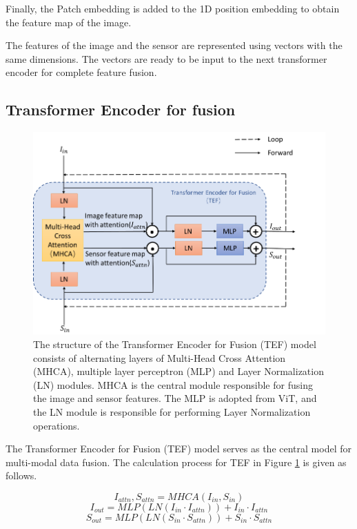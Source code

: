 \documentclass[acmsmall, screen]{acmart}
\begin{document}
Finally, the Patch embedding is added to the 1D position embedding to obtain the feature map of the image.

The features of the image and the sensor are represented using vectors with the same dimensions. The vectors are ready to be input to the next transformer encoder for complete feature fusion.



\subsection{Transformer Encoder for fusion}
\begin{figure}[htbp]
  \centering
  \includegraphics[width=0.8\linewidth]{pic/model_structure_TEF.png}
  \caption{The structure of the Transformer Encoder for Fusion (TEF) model consists of alternating layers of Multi-Head Cross Attention (MHCA), multiple layer perceptron (MLP) and Layer Normalization (LN) modules. MHCA is the central module responsible for fusing the image and sensor features. The MLP is adopted from ViT, and the LN module is responsible for performing Layer Normalization operations.}
  \label{model_structure_TEF}
\end{figure}




The Transformer Encoder for Fusion (TEF) model serves as the central model for multi-modal data fusion. The calculation process for TEF in Figure \ref{model_structure_TEF} is given as follows.


\begin{equation}
  I_{attn},S_{attn}=MHCA\left(I_{in},S_{in}\right)
\end{equation}
\begin{equation}
  I_{out}=MLP\left(LN\left(I_{in}\cdot I_{attn}\right)\right)+I_{in}\cdot I_{attn}
\end{equation}
\begin{equation}
  S_{out}=MLP\left(LN\left(S_{in}\cdot S_{attn}\right)\right)+S_{in}\cdot S_{attn}
\end{equation}
\end{document}
